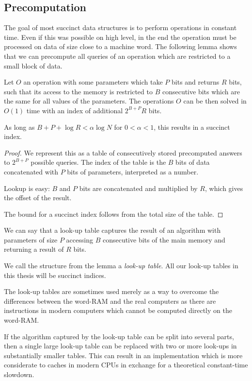 \subsection{Precomputation}

The goal of most succinct data structures is to perform operations in constant time.
Even if this was possible on high level, in the end the operation must be processed on data of size close to a machine word.
The following lemma shows that we can precompute all queries of an operation which are restricted to a small block of data.

\begin{lemma}
	Let $O$ an operation with some parameters which take $P$ bits and returns $R$ bits, such that its access to the memory is restricted to $B$ consecutive bits which are the same for all values of the parameters.
	The operations $O$ can be then solved in $O(1)$ time with an index of additional $2^{B+P} R$ bits.

	As long as $B + P + \log R < \alpha \log N$ for $0 < \alpha < 1$, this results in a succinct index.
\end{lemma}
\begin{proof}
	We represent this as a table of consecutively stored precomputed answers to $2^{B+P}$ possible queries.
	The index of the table is the $B$ bits of data concatenated with $P$ bits of parameters, interpreted as a number.

	Lookup is easy: $B$ and $P$ bits are concatenated and multiplied by $R$, which gives the offset of the result.
	
	The bound for a succinct index follows from the total size of the table.
\end{proof}

We can say that a look-up table captures the result of an algorithm with parameters of size $P$ accessing $B$ consecutive bits of the main memory and returning a result of $R$ bits.

We call the structure from the lemma a \emph{look-up table}.
All our look-up tables in this thesis will be succinct indices.

\bigbreak

The look-up tables are sometimes used merely as a way to overcome the differences between the word-RAM and the real computers as there are instructions in modern computers which cannot be computed directly on the word-RAM.

If the algorithm captured by the look-up table can be split into several parts, then a single large look-up table can be replaced with two or more look-ups in substantially smaller tables.
This can result in an implementation which is more considerate to caches in modern CPUs in exchange for a theoretical constant-time slowdown.

